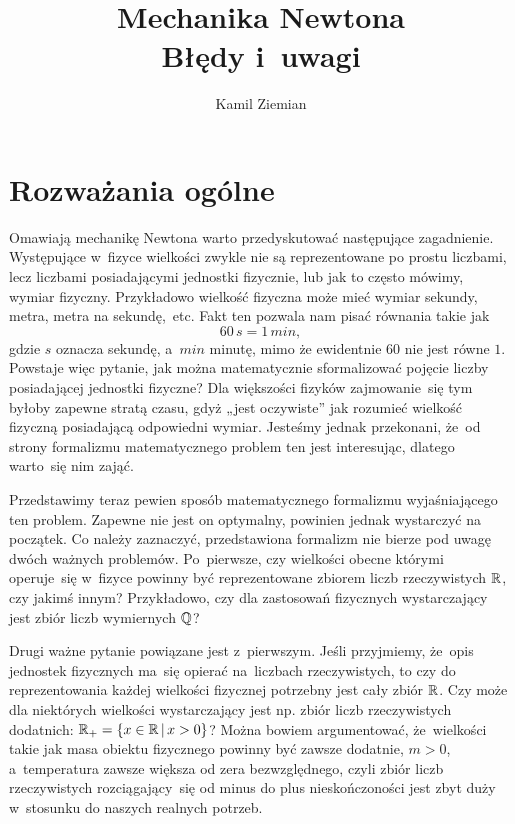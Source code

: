 \documentclass[a4paper,11pt]{article}
\title{Mechanika Newtona \\
  {\Large Błędy i~uwagi}}
\author{Kamil Ziemian}
\numberwithin{equation}{section}
\begin{document}





\maketitle %





\section{Rozważania ogólne}



Omawiają mechanikę Newtona warto przedyskutować następujące zagadnienie.
Występujące w~fizyce wielkości zwykle nie są reprezentowane po prostu
liczbami, lecz liczbami posiadającymi jednostki fizycznie, lub jak to
często mówimy, wymiar fizyczny. Przykładowo wielkość fizyczna może mieć
wymiar sekundy, metra, metra na sekundę,~etc. Fakt ten pozwala
nam pisać równania takie jak
\begin{equation}
  \label{eq:Mechanika-Rozwazania-ogolne-01}
  60 \, \si{s} = 1 \, \si{min},
\end{equation}
gdzie $\si{s}$ oznacza sekundę, a~$\si{min}$ minutę, mimo że ewidentnie
$60$ nie jest równe $1$. Powstaje więc pytanie, jak można matematycznie
sformalizować pojęcie liczby posiadającej jednostki fizyczne? Dla większości
fizyków zajmowanie~się tym byłoby zapewne stratą czasu, gdyż „jest
oczywiste” jak rozumieć wielkość fizyczną posiadającą odpowiedni wymiar.
Jesteśmy jednak przekonani, że~od strony formalizmu matematycznego problem
ten jest interesując, dlatego warto~się nim zająć.

Przedstawimy teraz pewien sposób matematycznego formalizmu wyjaśniającego
ten problem. Zapewne nie jest on optymalny, powinien jednak wystarczyć na
początek. Co należy zaznaczyć, przedstawiona formalizm nie bierze pod uwagę
dwóch ważnych problemów. Po~pierwsze, czy wielkości obecne którymi
operuje~się w~fizyce powinny być reprezentowane zbiorem liczb rzeczywistych
$\mathbb{R}$, czy jakimś innym? Przykładowo, czy dla zastosowań fizycznych
wystarczający jest zbiór liczb wymiernych $\mathbb{Q}$?

Drugi ważne pytanie powiązane jest z~pierwszym. Jeśli przyjmiemy,
że~opis jednostek fizycznych ma~się opierać na~liczbach rzeczywistych,
to czy do reprezentowania każdej wielkości fizycznej potrzebny jest cały
zbiór $\mathbb{R}$. Czy może dla niektórych wielkości wystarczający jest np.
zbiór liczb rzeczywistych dodatnich:
$\mathbb{R}_{ + } = \{ x \in \mathbb{R} \, | \, x > 0 \}$? Można bowiem argumentować,
że~wielkości takie jak masa obiektu fizycznego powinny być zawsze dodatnie,
$m > 0$, a~temperatura zawsze większa od zera bezwzględnego, czyli zbiór
liczb rzeczywistych rozciągający~się od minus do plus nieskończoności jest
zbyt duży w~stosunku do naszych realnych potrzeb.
\end{document}
